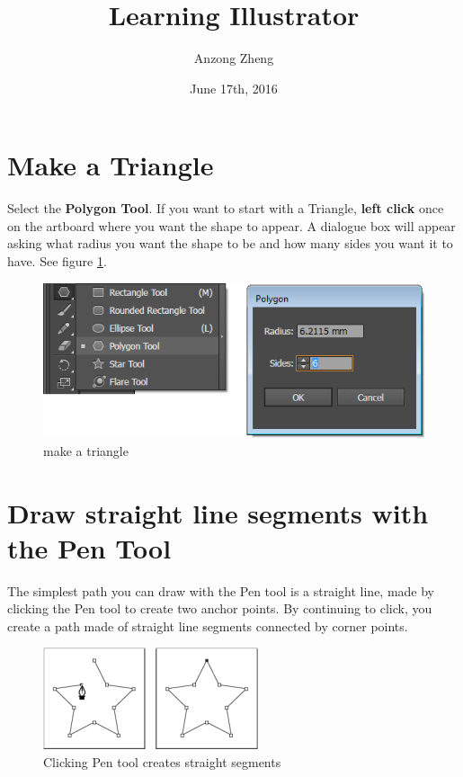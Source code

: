 \documentclass[10pt,a4paper]{article}
\begin{document}
\author{Anzong Zheng}
\title{Learning Illustrator}
\date{June 17th, 2016}
\maketitle
\newpage

\section{Make a Triangle}
Select the \textbf{Polygon Tool}. If you want to start with a Triangle, \textbf{left click} once on the artboard where you want the shape to appear. A dialogue box will appear asking what radius you want the shape to be and how many sides you want it to have. See figure \ref{fig:makeTriangle}.

\begin{figure}[h]
\centering
\includegraphics[width=0.7\linewidth]{makeTriangle}
\caption{make a triangle}
\label{fig:makeTriangle}
\end{figure}

\section{Draw straight line segments with the Pen Tool}
The simplest path you can draw with the Pen tool is a straight line, made by clicking the Pen tool to create two anchor points. By continuing to click, you create a path made of straight line segments connected by corner points.

\begin{figure}[h]
\centering
\includegraphics[width=0.7\linewidth]{straight_segments}
\caption{Clicking Pen tool creates straight segments}
\label{fig:straight_segments}
\end{figure}
\end{document}
